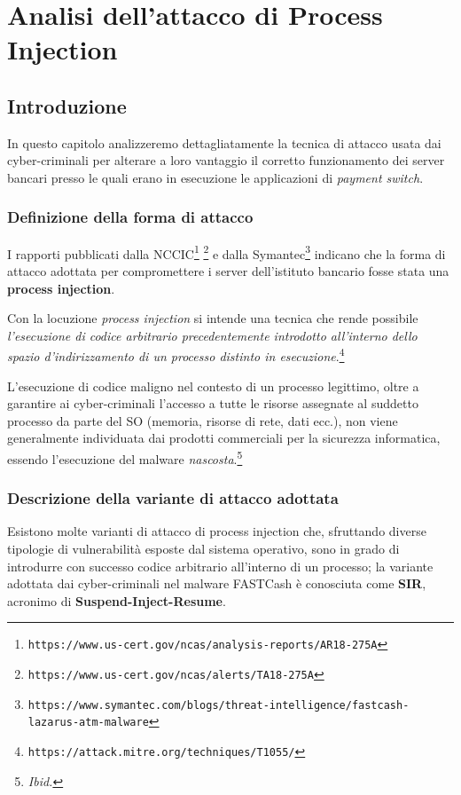 \documentclass[10pt,a4paper, titlepage]{report}
\begin{document}
\newpage
\chapter{Analisi dell'attacco di Process Injection}

\section{Introduzione}

In questo capitolo analizzeremo dettagliatamente la tecnica di attacco usata dai cyber-criminali per alterare a loro vantaggio il corretto funzionamento dei server bancari presso le quali erano in esecuzione le applicazioni di \textit{payment switch}.

\subsection{Definizione della forma di attacco}

I rapporti pubblicati dalla NCCIC\footnote{\texttt{https://www.us-cert.gov/ncas/analysis-reports/AR18-275A}} \footnote{\texttt{https://www.us-cert.gov/ncas/alerts/TA18-275A}} e dalla Symantec\footnote{\texttt{https://www.symantec.com/blogs/threat-intelligence/fastcash-lazarus-atm-malware}} indicano che la forma di attacco adottata per compromettere i server dell'istituto bancario fosse stata una \textbf{process injection}.

Con la locuzione \textit{process injection} si intende una tecnica che rende possibile \textit{l'esecuzione di codice arbitrario precedentemente introdotto all'interno dello spazio d'indirizzamento di un processo distinto in esecuzione}.\footnote{\texttt{https://attack.mitre.org/techniques/T1055/}}

L'esecuzione di codice maligno nel contesto di un processo legittimo, oltre a garantire ai cyber-criminali l'accesso a tutte le risorse assegnate al suddetto processo da parte del SO (memoria, risorse di rete, dati ecc.), non viene generalmente individuata dai prodotti commerciali per la sicurezza informatica, essendo l'esecuzione del malware \textit{nascosta}.\footnote{\textit{Ibid.}}

\subsection{Descrizione della variante di attacco adottata}

Esistono molte varianti di attacco di process injection che, sfruttando diverse tipologie di vulnerabilità esposte dal sistema operativo, sono in grado di introdurre con successo codice arbitrario all'interno di un processo; la variante adottata dai cyber-criminali nel malware FASTCash è conosciuta come \textbf{SIR}, acronimo di \textbf{Suspend-Inject-Resume}.
\end{document}

